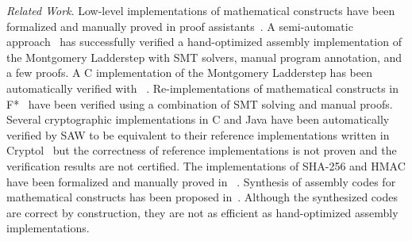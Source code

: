 
\noindent
\emph{Related Work}.
Low-level implementations of mathematical constructs have been formalized and manually proved in proof assistants~\cite{Aff13,ANY12,AM07,MG07,M:13:PPVB}.
A semi-automatic approach~\cite{C:14:VCS} has successfully verified a hand-optimized assembly implementation of the Montgomery Ladderstep with SMT solvers, manual program annotation, and a few \coq proofs.
A C implementation of the Montgomery Ladderstep has been automatically verified with \gfverif~\cite{BS:16:GFEV}.
Re-implementations of mathematical constructs in F*~\cite{project:everest} have been verified using a combination of SMT solving and manual proofs.
Several cryptographic implementations in C and Java have been automatically verified by SAW to be equivalent to their reference implementations written in Cryptol~\cite{T:16:AVRWCI} but the correctness of reference implementations is not proven and the verification results are not certified.
The \openssl implementations of SHA-256 and HMAC have been formalized and manually proved in \coq~\cite{A:15:VCPS,B:15:VCSOH}.
Synthesis of assembly codes for mathematical constructs has been proposed in~\cite{fiat:crypto}.
Although the synthesized codes are correct by construction, they are not as efficient as hand-optimized assembly implementations.





